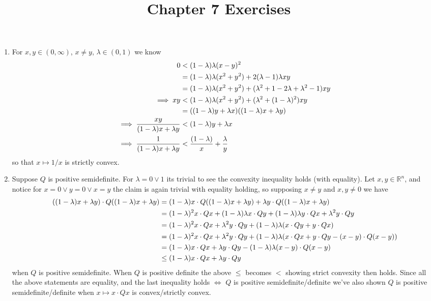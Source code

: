 \documentclass{article}
\title{Chapter 7 Exercises}
\newenvironment{ex}[1]
  {\renewcommand\theexercise{#1}\exercise}
  {\endexercise}
\newcommand{\R}[1]{\mathbb{R}^{#1}}
\begin{document}
\begin{ex}{7.1} %
  \begin{enumerate}[label=(\alph*)] \, \\
    \item For $x, y \in (0, \infty)$, $x \ne y$, $\lambda \in (0, 1)$ we know
      \begin{align*}
        0 &< (1-\lambda)\lambda (x-y)^2 \\
        &= (1-\lambda)\lambda (x^2 + y^2) + 2(\lambda-1)\lambda xy \\
        &= (1-\lambda)\lambda (x^2 + y^2) + (\lambda^2  + 1 - 2\lambda + \lambda^2 - 1)xy \\
        \implies xy &< (1-\lambda)\lambda (x^2 + y^2) + (\lambda^2 + ( 1 - \lambda )^2)xy \\
        &= ((1-\lambda)y + \lambda x)((1-\lambda)x + \lambda y) \\
        \implies \frac{xy}{(1-\lambda)x + \lambda y} &< (1-\lambda)y + \lambda x \\
        \implies \frac{1}{(1-\lambda)x + \lambda y} &< \frac{(1-\lambda)}{x} + \frac{\lambda}{y}
      \end{align*}
      so that $x \mapsto 1/x$ is strictly convex.
    \item
      Suppose $Q$ is positive semidefinite. For $\lambda = 0 \lor 1$ its trivial to see the convexity inequality holds (with equality). Let $x, y \in \R{n}$, and notice for $x = 0 \lor y = 0 \lor x = y$ the claim is again trivial with equality holding, so supposing $x \ne y$ and $x, y \ne 0$ we have
      \begin{align*}
        ((1-\lambda)x + \lambda y) \cdot Q ((1-\lambda)x + \lambda y) &= (1-\lambda)x \cdot Q ((1-\lambda)x + \lambda y) +  \lambda y \cdot Q ((1-\lambda)x + \lambda y) \\
        &= (1-\lambda)^2 x \cdot Q x + (1-\lambda)\lambda x \cdot Q y + (1-\lambda)\lambda y \cdot Q x + \lambda^2 y \cdot Q y \\
        &= (1-\lambda)^2 x \cdot Q x + \lambda^2 y \cdot Q y + (1-\lambda)\lambda(x \cdot Q y + y \cdot Q x) \\
        &= (1-\lambda)^2 x \cdot Q x + \lambda^2 y \cdot Q y + (1-\lambda)\lambda ( x \cdot Q x + y \cdot Q y - (x - y) \cdot Q (x - y) ) \\
        &= (1-\lambda) x \cdot Q x + \lambda y \cdot Q y - (1-\lambda)\lambda (x - y) \cdot Q (x - y) \\
        &\le (1-\lambda) x \cdot Q x + \lambda y \cdot Q y
      \end{align*}
      when $Q$ is positive semidefinite. When $Q$ is positive definite the above $\le$ becomes $<$ showing strict convexity then holds. Since all the above statements are equality, and the last inequality holds $\iff$ $Q$ is positive semidefinite/definite we've also shown $Q$ is positive semidefinite/definite when $x \mapsto x \cdot Q x$ is convex/strictly convex.
  \end{enumerate}
\end{ex} %
\end{document}
